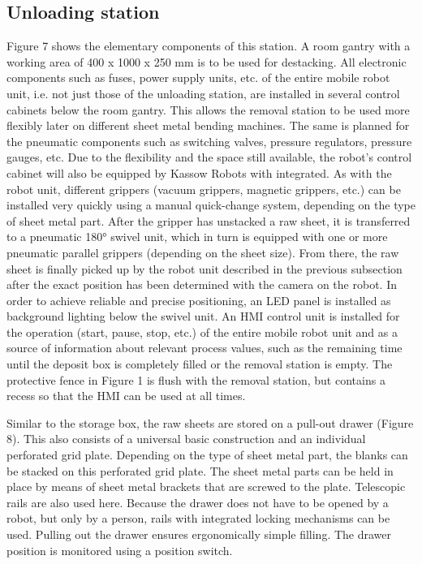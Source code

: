\subsection{Unloading station}
    Figure 7 shows the elementary components of this station.
    A room gantry with a working area of 400 x 1000 x 250 mm is to be used for destacking. All electronic
    components such as fuses, power supply units, etc. of the entire mobile robot unit, i.e. not just those of
    the unloading station, are installed in several control cabinets below the room gantry. This allows the
    removal station to be used more flexibly later on different sheet metal bending machines. The same is
    planned for the pneumatic components such as switching valves, pressure regulators, pressure
    gauges, etc. Due to the flexibility and the space still available, the robot's control cabinet will also be
    equipped by Kassow Robots with integrated. As with the robot unit, different grippers (vacuum grippers, magnetic grippers, etc.) can be
    installed very quickly using a manual quick-change system, depending on the type of sheet metal part.
    After the gripper has unstacked a raw sheet, it is transferred to a pneumatic 180° swivel unit, which in
    turn is equipped with one or more pneumatic parallel grippers (depending on the sheet size). From
    there, the raw sheet is finally picked up by the robot unit described in the previous subsection after the
    exact position has been determined with the camera on the robot. In order to achieve reliable and
    precise positioning, an LED panel is installed as background lighting below the swivel unit. An HMI
    control unit is installed for the operation (start, pause, stop, etc.) of the entire mobile robot unit and as
    a source of information about relevant process values, such as the remaining time until the deposit
    box is completely filled or the removal station is empty. The protective fence in Figure 1 is flush with
    the removal station, but contains a recess so that the HMI can be used at all times.

    Similar to the storage box, the raw sheets are stored on a pull-out drawer (Figure 8). This also consists
    of a universal basic construction and an individual perforated grid plate. Depending on the type of
    sheet metal part, the blanks can be stacked on this perforated grid plate. The sheet metal parts can be
    held in place by means of sheet metal brackets that are screwed to the plate. Telescopic rails are also
    used here. Because the drawer does not have to be opened by a robot, but only by a person, rails with
    integrated locking mechanisms can be used. Pulling out the drawer ensures ergonomically simple
    filling. The drawer position is monitored using a position switch.
